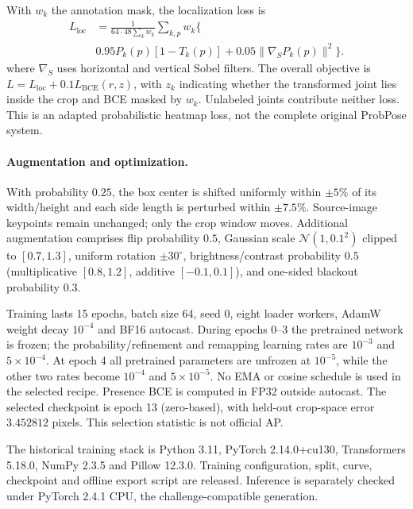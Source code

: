 \documentclass[a4paper,10pt,conference]{ieeeconf}
\begin{document}
With $w_k$ the annotation mask, the localization loss is
\begin{equation}
\begin{split}
 L_{\mathrm{loc}} &= \frac{1}{64\cdot48\sum_k w_k}\sum_{k,p} w_k\bigl\{\\
 &0.95P_k(p)[1-T_k(p)]+0.05\|\nabla_S P_k(p)\|^2\bigr\}.
\end{split}
\end{equation}
where $\nabla_S$ uses horizontal and vertical Sobel filters. The overall objective is $L=L_{\mathrm{loc}}+0.1L_{\mathrm{BCE}}(r,z)$, with $z_k$ indicating whether the transformed joint lies inside the crop and BCE masked by $w_k$. Unlabeled joints contribute neither loss. This is an adapted probabilistic heatmap loss, not the complete original ProbPose system.

\paragraph{Augmentation and optimization.}
With probability $0.25$, the box center is shifted uniformly within $\pm5\%$ of its width/height and each side length is perturbed within $\pm7.5\%$. Source-image keypoints remain unchanged; only the crop window moves. Additional augmentation comprises flip probability $0.5$, Gaussian scale $\mathcal{N}(1,0.1^2)$ clipped to $[0.7,1.3]$, uniform rotation $\pm30^\circ$, brightness/contrast probability $0.5$ (multiplicative $[0.8,1.2]$, additive $[-0.1,0.1]$), and one-sided blackout probability $0.3$.

Training lasts 15 epochs, batch size 64, seed 0, eight loader workers, AdamW weight decay $10^{-4}$ and BF16 autocast. During epochs 0--3 the pretrained network is frozen; the probability/refinement and remapping learning rates are $10^{-3}$ and $5\!\times\!10^{-4}$. At epoch 4 all pretrained parameters are unfrozen at $10^{-5}$, while the other two rates become $10^{-4}$ and $5\!\times\!10^{-5}$. No EMA or cosine schedule is used in the selected recipe. Presence BCE is computed in FP32 outside autocast. The selected checkpoint is epoch 13 (zero-based), with held-out crop-space error $3.452812$ pixels. This selection statistic is not official AP.

The historical training stack is Python 3.11, PyTorch 2.14.0+cu130, Transformers 5.18.0, NumPy 2.3.5 and Pillow 12.3.0. Training configuration, split, curve, checkpoint and offline export script are released. Inference is separately checked under PyTorch 2.4.1 CPU, the challenge-compatible generation.
\end{document}
